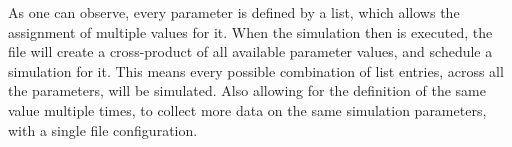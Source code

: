     As one can observe, every parameter is defined by a list, which allows the assignment of multiple values for it. When the simulation then is executed, the file will create a cross-product of all available parameter values, and schedule a simulation for it. This means every possible combination of list entries, across all the parameters, will be simulated. Also allowing for the definition of the same value multiple times, to collect more data on the same simulation parameters, with a single file configuration.

    
    